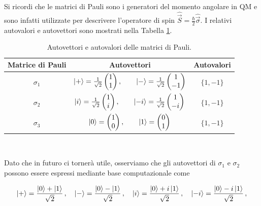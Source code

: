 \noindent Si ricordi che le matrici di Pauli sono i generatori del momento angolare in QM e sono infatti utilizzate per descrivere l'operatore di spin $\hat{\vec{S}} = \frac{\hbar}{2} \hat{\vec{\sigma}}$. I relativi autovalori e autovettori sono mostrati nella Tabella \ref{tab:Pauli_eig}.

\begin{table}[!ht]
	\centering
    \begin{tabular}{ccc}
        \toprule
        \textbf{Matrice di Pauli} & \textbf{Autovettori} & \textbf{Autovalori}  \\
        \midrule
        $\sigma_1$ & $\ket + = \frac{1}{\sqrt 2} \begin{pmatrix} 1 \\ 1 \end{pmatrix}, \qquad \ket - = \frac{1}{\sqrt 2} \begin{pmatrix} 1 \\ -1 \end{pmatrix} $ & $\lbrace 1, -1 \rbrace$ \\
        $\sigma_2$ & $\ket i = \frac{1}{\sqrt 2} \begin{pmatrix} 1 \\ i \end{pmatrix}, \qquad \ket{-i} = \frac{1}{\sqrt 2} \begin{pmatrix} 1 \\ -i \end{pmatrix} $ & $\lbrace 1, -1 \rbrace$ \\
        $\sigma_3$ & $\ket 0 = \begin{pmatrix} 1 \\ 0 \end{pmatrix}, \qquad \ket 1 = \begin{pmatrix} 0 \\ 1 \end{pmatrix} $ & $\lbrace 1,-1 \rbrace$ \\
        \bottomrule
    \end{tabular}\\
    \caption{Autovettori e autovalori delle matrici di Pauli.}
    \label{tab:Pauli_eig}
\end{table}

\noindent Dato che in futuro ci tornerà utile, osserviamo che gli autovettori di $\sigma_1$ e $\sigma_2$ possono essere espressi mediante base computazionale come

\begin{equation}\label{basi_di_sigma_12}
    \ket + = \frac{\ket 0 + \ket 1}{\sqrt 2} \, , \quad \ket - = \frac{\ket 0 - \ket 1}{\sqrt 2} \, , \quad \ket i = \frac{\ket 0 + i \ket 1}{\sqrt 2} \, , \quad \ket{-i} = \frac{\ket 0 - i \ket 1}{\sqrt 2} \, ,
\end{equation}

